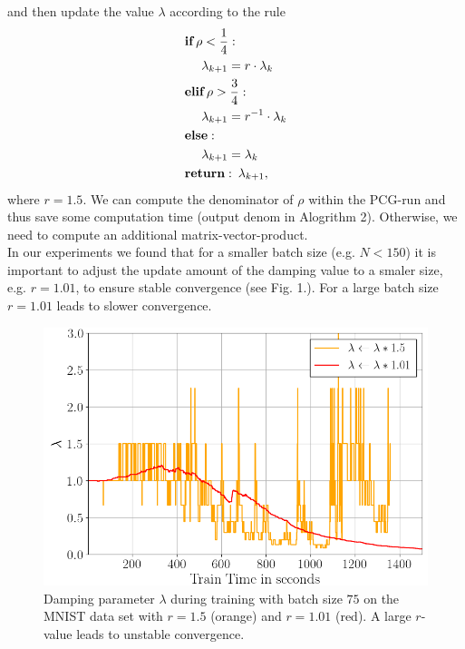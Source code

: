 \documentclass[conference]{IEEEtran}
\begin{document}
and then update the value $\lambda$ according to the rule
\begin{align}
	&\textbf{if}\:\rho<\frac{1}{4}:\notag\\
	&\text{ }\text{ }\text{ }\text{ }\lambda_{k+1} = r\cdot\lambda_{k}\notag\\
	&\textbf{elif}\:\rho>\frac{3}{4}:\notag\\
	&\text{ }\text{ }\text{ }\text{ }\lambda_{k + 1} = r^{-1}\cdot\lambda_{k}\notag\\
	&\textbf{else}: \notag\\
	&\text{ }\text{ }\text{ }\text{ }\lambda_{k + 1} = \lambda_{k}\notag\\
	&\textbf{return}:\:\lambda_{k + 1},
\end{align}
where $r=1.5$. We can compute the denominator of $\rho$ within the PCG-run and thus save some computation time (output denom in Alogrithm 2). Otherwise, we need to compute an additional matrix-vector-product.\\
In our experiments we found that for a smaller batch size (e.g. $N<150$) it is important to adjust the update amount of the damping value to a smaler size, e.g. $r=1.01$, to ensure stable convergence (see Fig. 1.). For a large batch size $r=1.01$ leads to slower convergence.

\begin{figure}[htbp]
	\centerline{\includegraphics[scale=0.52]{lambda.png}}
	\caption{Damping parameter $\lambda$ during training with batch size $75$ on the MNIST data set with $r=1.5$ (orange) and $r=1.01$ (red). A large $r$-value leads to unstable convergence.}
	\label{fig1}
\end{figure}
\end{document}
